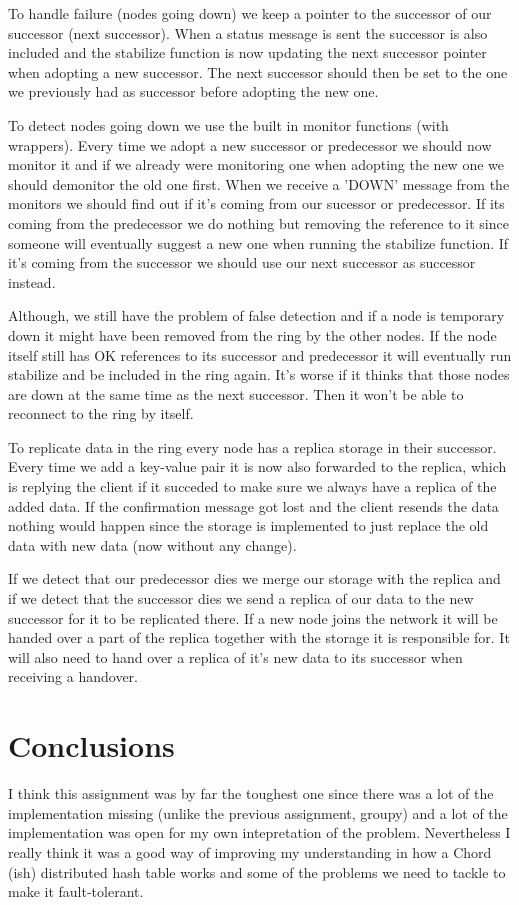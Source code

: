 \documentclass[a4paper, 11pt]{article}
\begin{document}
To handle failure (nodes going down) we keep a pointer to the successor of our successor (next successor). When a status message is sent the successor is also included and the stabilize function is now updating the next successor pointer when adopting a new successor. The next successor should then be set to the one we previously had as successor before adopting the new one.

To detect nodes going down we use the built in monitor functions (with wrappers). Every time we adopt a new successor or predecessor we should now monitor it and if we already were monitoring one when adopting the new one we should demonitor the old one first. When we receive a 'DOWN' message from the monitors we should find out if it's coming from our sucessor or predecessor. If its coming from the predecessor we do nothing but removing the reference to it since someone will eventually suggest a new one when running the stabilize function. If it's coming from the successor we should use our next successor as successor instead. 

Although, we still have the problem of false detection and if a node is temporary down it might have been removed from the ring by the other nodes. If the node itself still has OK references to its successor and predecessor it will eventually run stabilize and be included in the ring again. It's worse if it thinks that those nodes are down at the same time as the next successor. Then it won't be able to reconnect to the ring by itself.

To replicate data in the ring every node has a replica storage in their successor. Every time we add a key-value pair it is now also forwarded to the replica, which is replying the client if it succeded to make sure we always have a replica of the added data. If the confirmation message got lost and the client resends the data nothing would happen since the storage is implemented to just replace the old data with new data (now without any change).

If we detect that our predecessor dies we merge our storage with the replica and if we detect that the successor dies we send a replica of our data to the new successor for it to be replicated there. If a new node joins the network it will be handed over a part of the replica together with the storage it is responsible for. It will also need to hand over a replica of it's new data to its successor when receiving a handover.

\section{Conclusions}

I think this assignment was by far the toughest one since there was a lot of the implementation missing (unlike the previous assignment, groupy) and a lot of the implementation was open for my own intepretation of the problem. Nevertheless I really think it was a good way of improving my understanding in how a Chord (ish) distributed hash table works and some of the problems we need to tackle to make it fault-tolerant.
\end{document}

